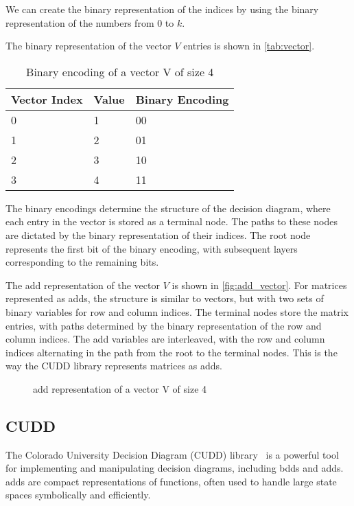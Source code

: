 We can create the binary representation of the indices by using the binary representation of the numbers from 0 to $k$.

The binary representation of the vector $V$ entries is shown in \autoref{tab:vector}.
\begin{table}
    \centering
    \caption{Binary encoding of a vector V of size 4}
    \label{tab:vector}
    \begin{tabular}{lll}
        \toprule
        Vector Index & Value & Binary Encoding \\
        \midrule
        0            & 1     & 00            \\
        1            & 2     & 01            \\
        2            & 3     & 10            \\
        3            & 4     & 11            \\
        \bottomrule
    \end{tabular}
\end{table}

The binary encodings determine the structure of the decision diagram, where each entry in the vector is stored as a terminal node.
The paths to these nodes are dictated by the binary representation of their indices.
The root node represents the first bit of the binary encoding, with subsequent layers corresponding to the remaining bits.

The \gls{add} representation of the vector $V$ is shown in \autoref{fig:add_vector}.
For matrices represented as \glspl{add}, the structure is similar to vectors, but with two sets of binary variables for row and column indices.
The terminal nodes store the matrix entries, with paths determined by the binary representation of the row and column indices.
The \gls{add} variables are interleaved, with the row and column indices alternating in the path from the root to the terminal nodes.
This is the way the CUDD library represents matrices as \glspl{add}.
\begin{figure}
    \centering
    
    \caption{\gls{add} representation of a vector V of size 4}
    \label{fig:add_vector}
\end{figure}

\subsection{CUDD}\label{subsec:cudd}
The Colorado University Decision Diagram (CUDD) library~\cite{somenzi1997cudd} is a powerful tool for implementing and manipulating decision diagrams, including \glspl{bdd} and \glspl{add}. \glspl{add} are compact representations of functions, often used to handle large state spaces symbolically and efficiently.

